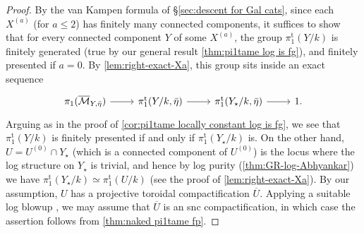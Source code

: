 \documentclass[a4paper,twoside,11pt,reqno]{amsart}
\newcommand{\cM}{{\mathcal M}}
\newcommand{\pitame}{\pi_1^{\mathrm{t}}}
\theoremstyle{definition}
\numberwithin{equation}{subsection}
\begin{document}
\begin{proof}
By the van Kampen formula of \S\ref{sec:descent for Gal cats}, since each $X^{(a)}$ (for $a\leq 2$) has finitely many connected components, it suffices to show that for every connected component $Y$ of some $X^{(a)}$, the group $\pitame(Y/k)$ is finitely generated (true by our general result \cref{thm:pi1tame log is fg}), and finitely presented if $a=0$. By \cref{lem:right-exact-Xa}, this group sits inside an exact sequence 
\[
    \begin{tikzcd}
        \pi_1(\overline{\cM}_{Y,\bar\eta}) \ar[r] & \pitame(Y/k,\bar\eta)\ar[r] & \pitame(Y_\star/k,\bar\eta)\ar[r] & 1.
    \end{tikzcd}
\]
Arguing as in the proof of \cref{cor:pi1tame locally constant log is fg}, we see that $\pitame(Y/k)$ is finitely presented if and only if $\pitame(Y_\star/k)$ is. On the other hand, $U=U^{(0)}\cap Y_\star$ (which is a connected component of $U^{(0)}$) is the locus where the log structure on $Y_\star$ is trivial, and hence by log purity (\cref{thm:GR-log-Abhyankar}) we have $\pitame(Y_\star/k)\simeq \pitame(U/k)$ (see the proof of \cref{lem:right-exact-Xa}). By our assumption, $U$ has a projective toroidal compactification $\overline{U}$. Applying a suitable log blowup \cite{Niziol}, we may assume that $\overline{U}$ is an snc compactification, in which case the assertion follows from \cref{thm:naked pi1tame fp}.
\end{proof}
\end{document}
